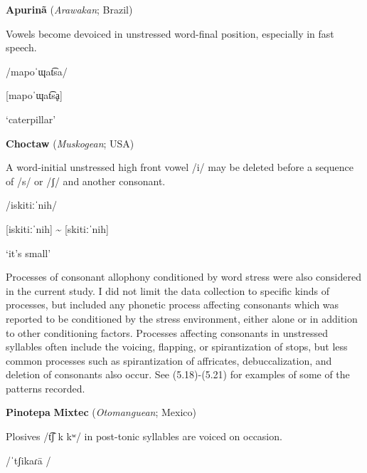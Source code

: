 \ea\label{ex:(5.16)}
  \textbf{Apurinã} (\textit{Arawakan}; Brazil)



Vowels become devoiced in unstressed word-final position, especially in fast speech.



/mapoˈɰat͡sa/



[mapoˈɰat͡sḁ]



‘caterpillar’



\citep[60-1]{Facundes2000}
\z



\ea\label{ex:(5.17)}
  \textbf{Choctaw} (\textit{Muskogean}; USA)



A word-initial unstressed high front vowel /i/ may be deleted before a sequence of /s/ or /ʃ/ and another consonant.



/iskitiːˈnih/



[iskitiːˈnih] {\textasciitilde} [skitiːˈnih]



‘it’s small’



\citep[19]{Broadwell2006}
\z



  Processes of consonant allophony conditioned by word stress were also considered in the current study. I did not limit the data collection to specific kinds of processes, but included any phonetic process affecting consonants which was reported to be conditioned by the stress environment, either alone or in addition to other conditioning factors. Processes affecting consonants in unstressed syllables often include the voicing, flapping, or spirantization of stops, but less common processes such as spirantization of affricates, debuccalization, and deletion of consonants also occur. See (5.18)-(5.21) for examples of some of the patterns recorded.



\ea\label{ex:(5.18)}
  \textbf{Pinotepa} \textbf{Mixtec} (\textit{Otomanguean}; Mexico)



Plosives /t͡ʃ k kʷ/ in post-tonic syllables are voiced on occasion.



/ˈtʃikaɾa\={} /



